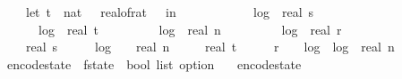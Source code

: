 \begin{isabellebody}
\ \ \ \ let\ t\ {\isacharequal}{\kern0pt}\ nat\ {\isasymlceil}{}{}\ {\isacharslash}{\kern0pt}\ {\isacharparenleft}{\kern0pt}real{\isacharunderscore}{\kern0pt}of{\isacharunderscore}{\kern0pt}rat\ {\isasymdelta}{\isacharparenright}{\kern0pt}\ {\isasymrceil}\ in\isanewline
\ \ \ \ {}\ {\isacharplus}{\kern0pt}\isanewline
\ \ \ \ {}\ {\isacharasterisk}{\kern0pt}\ log\ {}\ {\isacharparenleft}{\kern0pt}real\ s\ {\isacharplus}{\kern0pt}\ {}{\isacharparenright}{\kern0pt}\ {\isacharplus}{\kern0pt}\isanewline
\ \ \ \ {}\ {\isacharasterisk}{\kern0pt}\ log\ {}\ {\isacharparenleft}{\kern0pt}real\ t\ {\isacharplus}{\kern0pt}\ {}{\isacharparenright}{\kern0pt}\ {\isacharplus}{\kern0pt}\isanewline
\ \ \ \ {}\ {\isacharasterisk}{\kern0pt}\ log\ {}\ {\isacharparenleft}{\kern0pt}real\ n\ {\isacharplus}{\kern0pt}\ {}{}{\isacharparenright}{\kern0pt}\ {\isacharplus}{\kern0pt}\isanewline
\ \ \ \ {}\ {\isacharasterisk}{\kern0pt}\ log\ {}\ {\isacharparenleft}{\kern0pt}real\ r\ {\isacharplus}{\kern0pt}\ {}{\isacharparenright}{\kern0pt}\ {\isacharplus}{\kern0pt}\isanewline
\ \ \ \ real\ s\ {\isacharasterisk}{\kern0pt}\ {\isacharparenleft}{\kern0pt}{}{}\ {\isacharplus}{\kern0pt}\ {}\ {\isacharasterisk}{\kern0pt}\ log\ {}\ {\isacharparenleft}{\kern0pt}{}{}\ {\isacharplus}{\kern0pt}\ real\ n{\isacharparenright}{\kern0pt}\ {\isacharplus}{\kern0pt}\isanewline
\ \ \ \ real\ t\ {\isacharasterisk}{\kern0pt}\ {\isacharparenleft}{\kern0pt}{}{}\ {\isacharplus}{\kern0pt}\ {}\ {\isacharasterisk}{\kern0pt}\ r\ {\isacharplus}{\kern0pt}\ {}\ {\isacharasterisk}{\kern0pt}\ log\ {}\ {\isacharparenleft}{\kern0pt}log\ {}\ {\isacharparenleft}{\kern0pt}real\ n\ {\isacharplus}{\kern0pt}\ {}{\isacharparenright}{\kern0pt}{\isacharparenright}{\kern0pt}{\isacharparenright}{\kern0pt}{\isacharparenright}{\kern0pt}{\isacharparenright}{\kern0pt}{\isachardoublequoteclose}\isanewline
\isanewline
{}\isamarkupfalse%
\ encode{\isacharunderscore}{\kern0pt}state\ {\isacharcolon}{\kern0pt}{\isacharcolon}{\kern0pt}\ {\isachardoublequoteopen}f{}{\isacharunderscore}{\kern0pt}state\ {\isasymRightarrow}\ bool\ list\ option{\isachardoublequoteclose}\ \isanewline
\ \ {\isachardoublequoteopen}encode{\isacharunderscore}{\kern0pt}state\ {\isacharequal}{\kern0pt}\ \isanewline

\end{isabellebody}

